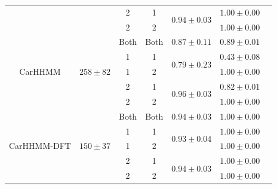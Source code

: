 \begin{table}[ht]
{\begin{tabular}{ccccccc}
                            &                                    & 2                             & 1                                & \multirow{2}{*}{$0.94\pm0.03$}    & $1.00 \pm 0.00$                       \\ 
                            &                                    & 2                             & 2                                &                                   & $1.00 \pm 0.00$                       \\ \hline
\multirow{5}{*}{CarHHMM}    & \multirow{5}{*}{$258 \pm 82$}   & Both                          & Both                             & $0.87 \pm 0.11$                   & $0.89 \pm 0.01$                       \\
                            &                                    & 1                             & 1                                & \multirow{2}{*}{$0.79\pm0.23$}    & $0.43 \pm 0.08$                       \\ 
                            &                                    & 1                             & 2                                &                                   & $1.00 \pm 0.00$                       \\ 
                            &                                    & 2                             & 1                                & \multirow{2}{*}{$0.96\pm0.03$}    & $0.82 \pm 0.01$                       \\ 
                            &                                    & 2                             & 2                                &                                   & $1.00 \pm 0.00$                       \\ \hline
\multirow{5}{*}{CarHHMM-DFT}& \multirow{5}{*}{$150 \pm 37$}   & Both                          & Both                             & $0.94 \pm 0.03$                   & $1.00 \pm 0.00$                       \\
                            &                                    & 1                             & 1                                & \multirow{2}{*}{$0.93\pm0.04$}    & $1.00 \pm 0.00$                       \\ 
                            &                                    & 1                             & 2                                &                                   & $1.00 \pm 0.00$                       \\ 
                            &                                    & 2                             & 1                                & \multirow{2}{*}{$0.94\pm0.03$}    & $1.00 \pm 0.00$                       \\ 
                            &                                    & 2                             & 2                                &                                   & $1.00 \pm 0.00$                       \\ \hline
\end{tabular}
}
\label{table:accuracy}
\end{table}

